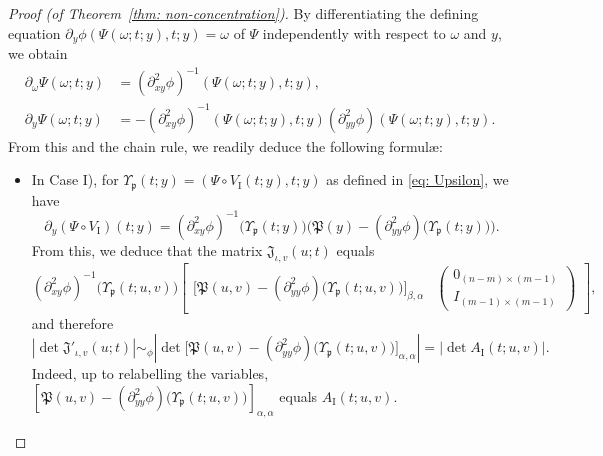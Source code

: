 \documentclass[reqno]{amsart}
\numberwithin{equation}{section}
\newcommand{\fJ}{\mathfrak{J}}
\newcommand{\fp}{\mathfrak{p}}
\newcommand{\fP}{\mathfrak{P}}
\theoremstyle{plain}
\theoremstyle{definition}
\newcommand{\tI}{\mathrm{I}}
\begin{document}
\begin{proof}[Proof (of Theorem~\ref{thm: non-concentration})]
By differentiating the defining equation $\partial_y\phi( \Psi(\omega; t; y),t;y)=\omega$ of $\Psi$ independently with respect to $\omega$ and $y$, we obtain
\begin{align*}
    \partial_{\omega}\Psi(\omega;t;y)&=(\partial_{xy}^2 \phi)^{-1}(\Psi(\omega;t;y), t; y),     \\
    \partial_y\Psi(\omega;t;y)&=-(\partial_{xy}^2 \phi)^{-1}(\Psi(\omega;t;y), t; y)(\partial^2_{yy}\phi)(\Psi(\omega;t;y), t; y).
\end{align*}
From this and the chain rule, we readily deduce the following formul\ae:
\begin{itemize}
    \item In Case I), for $\Upsilon_{\fp}(t;y) = (\Psi \circ V_{\tI}(t;y), t; y)$ as defined in \eqref{eq: Upsilon}, we have
    \begin{equation*}
\partial_y (\Psi\circ V_{\tI})(t;y) =(\partial_{xy}^2\phi)^{-1}\big(\Upsilon_{\fp}(t;y)\big) \big(\fP(y) - (\partial_{yy}^2\phi)\big(\Upsilon_{\fp}(t;y)\big)\big).
\end{equation*}
From this, we deduce that the matrix $\fJ_{\iota,v}(u;t)$ equals
\begin{equation*}
   (\partial^2_{xy}\phi)^{-1}\big(\Upsilon_{\fp}(t;u,v) \big)
    \begin{bmatrix}
 \big[\fP(u,v) - (\partial_{yy}^2\phi)\big(\Upsilon_{\fp}(t;u,v)\big)\big]_{\beta, \alpha} &
 \begin{pmatrix}
 0_{(n-m)\times(m-1)}\\
 I_{(m-1)\times (m-1)}
 \end{pmatrix}
    \end{bmatrix},
\end{equation*}
and therefore
\begin{equation*}
    |\det \fJ'_{\iota,v}(u;t)|\sim_\phi|\det \big[\fP(u,v) - (\partial_{yy}^2\phi)\big(\Upsilon_{\fp}(t;u,v)\big)\big]_{\alpha,\alpha}| = |\det A_{\tI}(t;u,v)|.
\end{equation*}
Indeed, up to relabelling the variables, $[\fP(u,v) - (\partial_{yy}^2\phi)\big(\Upsilon_{\fp}(t;u,v)\big)]_{\alpha,\alpha}$ equals $A_{\tI}(t;u,v)$.


\end{itemize}
\end{proof}
\end{document}
